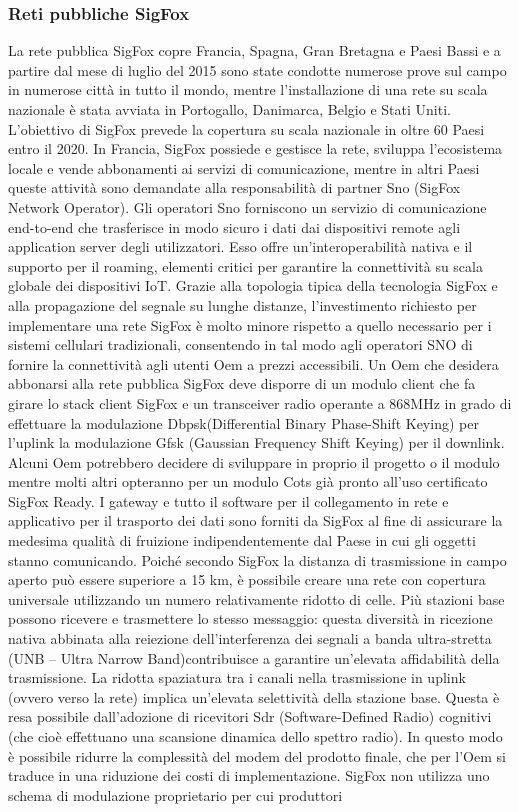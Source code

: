 \documentclass[a4paper]{report} %
\begin{document}
\subsubsection{Reti pubbliche SigFox}
La rete pubblica SigFox copre Francia, Spagna, Gran Bretagna e Paesi Bassi e a partire dal mese di luglio del 2015 sono state condotte numerose prove sul campo in numerose città in tutto il mondo, mentre l'installazione di una rete su scala nazionale è stata avviata in Portogallo, Danimarca, Belgio e Stati Uniti. L'obiettivo di SigFox prevede la copertura su scala nazionale in oltre 60 Paesi entro il 2020. In Francia, SigFox possiede e gestisce la rete, sviluppa l'ecosistema locale e vende abbonamenti ai servizi di comunicazione, mentre in altri Paesi queste attività sono demandate alla responsabilità di partner Sno (SigFox Network Operator). Gli operatori Sno forniscono un servizio di comunicazione end-to-end che trasferisce in modo sicuro i dati dai dispositivi remote agli application server degli utilizzatori. Esso offre un'interoperabilità nativa e il supporto per il roaming, elementi critici per garantire la connettività su scala globale dei dispositivi IoT. Grazie alla topologia tipica della tecnologia SigFox e alla propagazione del segnale su lunghe distanze, l'investimento richiesto per implementare una rete SigFox è molto minore rispetto a quello necessario per i sistemi cellulari tradizionali, consentendo in tal modo agli operatori SNO di fornire la connettività agli utenti Oem a prezzi accessibili. Un Oem che desidera abbonarsi alla rete pubblica SigFox deve disporre di un modulo client che fa girare lo stack client SigFox e un transceiver radio operante a 868MHz in grado di effettuare la modulazione Dbpsk(Differential Binary Phase-Shift Keying) per l'uplink la modulazione Gfsk (Gaussian Frequency Shift Keying) per il downlink. Alcuni Oem potrebbero decidere di sviluppare in proprio il progetto o il modulo mentre molti altri opteranno per un modulo Cots già pronto all'uso certificato SigFox Ready. I gateway e tutto il software per il collegamento in rete e applicativo per il trasporto dei dati sono forniti da SigFox al fine di assicurare la medesima qualità di fruizione indipendentemente dal Paese in cui gli oggetti stanno comunicando. Poiché secondo SigFox la distanza di trasmissione in campo aperto può essere superiore a 15 km, è possibile creare una rete con copertura universale utilizzando un numero relativamente ridotto di celle. Più stazioni base possono ricevere e trasmettere lo stesso messaggio: questa diversità in ricezione nativa abbinata alla reiezione dell'interferenza dei segnali a banda ultra-stretta (UNB – Ultra Narrow Band)contribuisce a garantire un'elevata affidabilità della trasmissione. La ridotta spaziatura tra i canali nella trasmissione in uplink (ovvero verso la rete) implica un'elevata selettività della stazione base. Questa è resa possibile dall'adozione di ricevitori Sdr (Software-Defined Radio) cognitivi (che cioè effettuano una scansione dinamica dello spettro radio). In questo modo è possibile ridurre la complessità del modem del prodotto finale, che per l'Oem si traduce in una riduzione dei costi di implementazione. SigFox non utilizza uno schema di modulazione proprietario per cui produttori 
\end{document}
